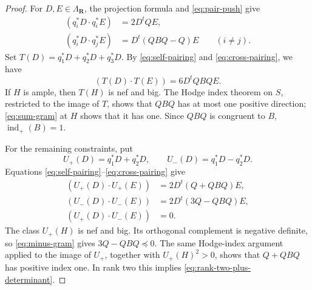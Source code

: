 \documentclass[12pt]{amsart}
\numberwithin{equation}{section}
\newtheorem{proposition}[theorem]{Proposition}
\theoremstyle{definition}
\theoremstyle{remark}
\newcommand{\R}{\mathbf R}
\newcommand{\PP}{\mathbf P}
\newcommand{\indp}{\operatorname{ind}_{+}}
\begin{document}
\begin{proof}
For \(D,E\in\Lambda_{\R}\), the projection formula and
\eqref{eq:pair-push} give
\begin{align}
 (q_i^*D\cdot q_i^*E)&=2D^tQE,\label{eq:self-pairing}\\
 (q_i^*D\cdot q_j^*E)&=D^t(QBQ-Q)E
                         \qquad(i\ne j).\label{eq:cross-pairing}
\end{align}
Set \(T(D)=q_1^*D+q_2^*D+q_3^*D\).  By \eqref{eq:self-pairing} and \eqref{eq:cross-pairing}, we have
\begin{equation}\label{eq:sum-gram}
                         (T(D)\cdot T(E))=6D^tQBQE.
\end{equation}
If \(H\) is ample, then \(T(H)\) is nef and big.  The Hodge index
theorem on \(S\), restricted to the image of \(T\), shows that \(QBQ\)
has at most one positive direction; \eqref{eq:sum-gram} at \(H\)
shows that it has one.  Since \(QBQ\) is congruent to \(B\),
\(\indp(B)=1\).

For the remaining constraints, put
\[
 U_+(D)=q_1^*D+q_2^*D,\qquad
 U_-(D)=q_1^*D-q_2^*D.
\]
Equations \eqref{eq:self-pairing}--\eqref{eq:cross-pairing} give
\begin{align}
 (U_+(D)\cdot U_+(E))&=2D^t(Q+QBQ)E,\label{eq:plus-gram}\\
 (U_-(D)\cdot U_-(E))&=2D^t(3Q-QBQ)E,\label{eq:minus-gram}\\
 (U_+(D)\cdot U_-(E))&=0.\label{eq:plus-minus-orthogonal}
\end{align}
The class \(U_+(H)\) is nef and big. Its orthogonal complement is
negative definite, so \eqref{eq:minus-gram} gives
\(3Q-QBQ\preceq0\).  The same Hodge-index argument applied to the
image of \(U_+\), together with \(U_+(H)^2>0\), shows that
\(Q+QBQ\) has positive index one.  In rank two this implies
\eqref{eq:rank-two-plus-determinant}.
\end{proof}



\end{document}
